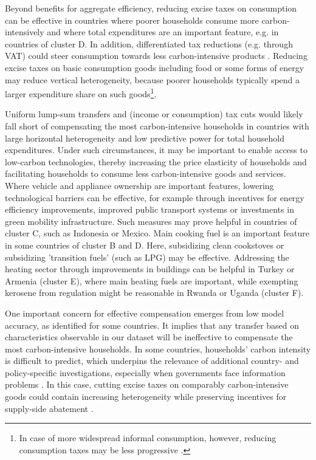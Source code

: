 \documentclass[12pt, a4paper]{article}
\begin{document}
Beyond benefits for aggregate efficiency, reducing excise taxes on consumption can be effective in countries where poorer households consume more carbon-intensively and where total expenditures are an important feature, e.g. in countries of cluster D. In addition, differentiated tax reductions (e.g. through VAT) could steer consumption towards less carbon-intensive products \autocite{Klenert.2023}. Reducing excise taxes on basic consumption goods including food or some forms of energy may reduce vertical heterogeneity, because poorer households typically spend a larger expenditure share on such goods\footnote{In case of more widespread informal consumption, however, reducing consumption taxes may be less progressive \autocite{Bachas.2020}.}. 

Uniform lump-sum transfers and (income or consumption) tax cuts would likely fall short of compensating the most carbon-intensive households in countries with large horizontal heterogeneity and low predictive power for total household expenditures. Under such circumstances, it may be important to enable access to low-carbon technologies, thereby increasing the price elasticity of households and facilitating households to consume less carbon-intensive goods and services. Where vehicle and appliance ownership are important features, lowering technological barriers can be effective, for example through incentives for energy efficiency improvements, improved public transport systems or investments in green mobility infrastructure. Such measures may prove helpful in countries of cluster C, such as Indonesia or Mexico. %
Main cooking fuel is an important feature in some countries of cluster B and D. Here, subsidizing clean cookstoves or subsidizing 'transition fuels' (such as LPG) may be effective. Addressing the heating sector through improvements in buildings can be helpful in Turkey or Armenia (cluster E), where main heating fuels are important, while exempting kerosene from regulation might be reasonable in Rwanda or Uganda (cluster F). %

One important concern for effective compensation emerges from low model accuracy, as identified for some countries. It implies that any transfer based on characteristics observable in our dataset will be ineffective to compensate the most carbon-intensive households. In some countries, households' carbon intensity is difficult to predict, which underpins the relevance of additional country- and policy-specific investigations, especially when governments face information problems \autocite{Mirrlees.1971}. In this case, cutting excise taxes on comparably carbon-intensive goods could contain increasing heterogeneity while preserving incentives for supply-side abatement \autocite{Goulder.2008}.
\end{document}
